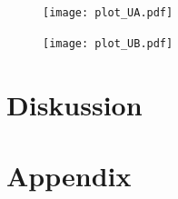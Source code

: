 

\begin{figure}[H]
    \centering
    \texttt{[image: plot\_UA.pdf]}
    \caption{} %
    \label{fig:a} %
\end{figure}

\begin{figure}[H]
    \centering
    \texttt{[image: plot\_UB.pdf]}
    \caption{} %
    \label{fig:b} %
\end{figure}


\section{Diskussion}



\newpage
\printbibliography
\newpage
\section*{Appendix}


